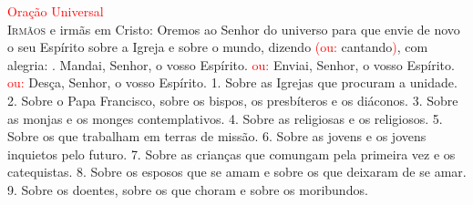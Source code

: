 \documentclass{book}
\begin{document}
\begin{flushleft}
    \textcolor{red}{Oração Universal}
    \vspace{0.2cm} \\
    \lettrine[findent=2pt]{\color{red}I}{rmãos} e irmãs em Cristo:
    \newline
    Oremos ao Senhor do universo
    \newline
    para que envie de novo o seu Espírito
    \newline
    sobre a Igreja e sobre o mundo,
    \newline
    dizendo \textcolor{red}{(ou:} cantando\textcolor{red}{)}, com alegria:
    \vspace{0.1cm}
    \newline
    {\color{red} \Rbar.} Mandai, Senhor, o vosso Espírito.
    \newline
    \textcolor{red}{ou:} Enviai, Senhor, o vosso Espírito.
    \newline
    \textcolor{red}{ou:} Desça, Senhor, o vosso Espírito.
    \vspace{0.1cm}
    \newline
    {\color{red} 1.} Sobre as Igrejas que procuram a unidade.
    \vspace{0.1cm}
    \newline
    {\color{red} 2.} Sobre o Papa Francisco, sobre os bispos, os presbíteros e os diáconos.
    \vspace{0.1cm}
    \newline
    {\color{red} 3.} Sobre as monjas e os monges contemplativos.
    \vspace{0.1cm}
    \newline
    {\color{red} 4.} Sobre as religiosas e os religiosos.
    \vspace{0.1cm}
    \newline
    {\color{red} 5.} Sobre os que trabalham em terras de missão.
    \vspace{0.1cm}
    \newline
    {\color{red} 6.} Sobre as jovens e os jovens inquietos pelo futuro.
    \vspace{0.1cm}
    \newline
    {\color{red} 7.} Sobre as crianças que comungam pela primeira vez e os catequistas.
    \vspace{0.1cm}
    \newline
    {\color{red} 8.} Sobre os esposos que se amam e sobre os que deixaram de se amar.
    \vspace{0.1cm}
    \newline
    {\color{red} 9.} Sobre os doentes, sobre os que choram e sobre os moribundos.

\end{flushleft}
\end{document}
